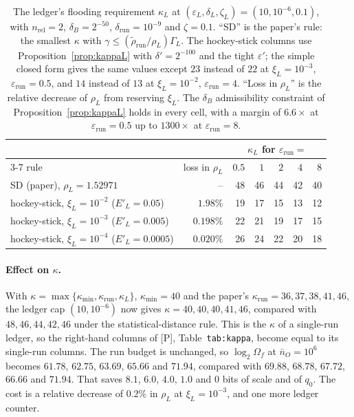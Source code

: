 \documentclass[11pt]{article}
\theoremstyle{definition}
\theoremstyle{plain}
\newcommand{\nrel}{n_{\mathrm{rel}}}
\newcommand{\Pp}{\textup{[P]}}
\begin{document}
\begin{table}[ht]
\centering\small
\caption{The ledger's flooding requirement $\kappa_L$ at $(\varepsilon_L,\delta_L,\zeta_L)=(10,10^{-6},0.1)$, with $\nrel=2$, $\delta_B=2^{-50}$, $\delta_{\mathrm{run}}=10^{-9}$ and $\zeta=0.1$. ``SD'' is the paper's rule: the smallest $\kappa$ with $\gamma\le(\tilde\rho_{\mathrm{run}}/\rho_L)\Gamma_L$. The hockey-stick columns use Proposition~\ref{prop:kappaL} with $\delta'=2^{-100}$ and the tight $\varepsilon'$; the simple closed form gives the same values except $23$ instead of $22$ at $\xi_L=10^{-3}$, $\varepsilon_{\mathrm{run}}=0.5$, and $14$ instead of $13$ at $\xi_L=10^{-2}$, $\varepsilon_{\mathrm{run}}=4$. ``Loss in $\rho_L$'' is the relative decrease of $\rho_L$ from reserving $\xi_L$. The $\delta_B$ admissibility constraint of Proposition~\ref{prop:kappaL} holds in every cell, with a margin of $6.6\times$ at $\varepsilon_{\mathrm{run}}=0.5$ up to $1300\times$ at $\varepsilon_{\mathrm{run}}=8$.}
\label{tab:kappaL}
\begin{tabular}{@{}lrrrrrr@{}}
\toprule
 & & \multicolumn{5}{c}{$\kappa_L$ for $\varepsilon_{\mathrm{run}}=$} \\
\cmidrule(l){3-7}
rule & loss in $\rho_L$ & $0.5$ & $1$ & $2$ & $4$ & $8$ \\
\midrule
SD (paper), $\rho_L=1.52971$ & -- & 48 & 46 & 44 & 42 & 40 \\
hockey-stick, $\xi_L=10^{-2}$ ($E'_L=0.05$) & $1.98\%$ & 19 & 17 & 15 & 13 & 12 \\
hockey-stick, $\xi_L=10^{-3}$ ($E'_L=0.005$) & $0.198\%$ & 22 & 21 & 19 & 17 & 15 \\
hockey-stick, $\xi_L=10^{-4}$ ($E'_L=0.0005$) & $0.020\%$ & 26 & 24 & 22 & 20 & 18 \\
\bottomrule
\end{tabular}
\end{table}

\paragraph{Effect on $\kappa$.} With $\kappa=\max\{\kappa_{\min},\kappa_{\mathrm{run}},\kappa_L\}$, $\kappa_{\min}=40$ and the paper's $\kappa_{\mathrm{run}}=36,37,38,41,46$, the ledger cap $(10,10^{-6})$ now gives $\kappa=40,40,40,41,46$, compared with $48,46,44,42,46$ under the statistical-distance rule. This is the $\kappa$ of a single-run ledger, so the right-hand columns of \Pp, Table~\texttt{tab:kappa}, become equal to its single-run columns. The run budget is unchanged, so $\log_2\Omega_f$ at $\bar n_O=10^6$ becomes $61.78$, $62.75$, $63.69$, $65.66$ and $71.94$, compared with $69.88$, $68.78$, $67.72$, $66.66$ and $71.94$. That saves $8.1$, $6.0$, $4.0$, $1.0$ and $0$ bits of scale and of $q_0$. The cost is a relative decrease of $0.2\%$ in $\rho_L$ at $\xi_L=10^{-3}$, and one more ledger counter.
\end{document}
